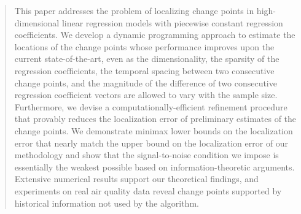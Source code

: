 \documentclass[twoside]{article}
\begin{document}
%

%


\begin{abstract}
This paper addresses the problem of localizing change points in high-dimensional linear regression models with piecewise constant regression coefficients. We develop a dynamic programming approach to estimate the locations of the change points whose performance improves upon the current state-of-the-art, even as the dimensionality, the sparsity of the regression coefficients, the temporal spacing between two consecutive change points, and the magnitude of the difference of two consecutive regression coefficient vectors are allowed to vary with the sample size. Furthermore, we devise a computationally-efficient refinement procedure that provably reduces the localization error of preliminary estimates of the change points. We demonstrate minimax lower bounds on the localization error that nearly match the upper bound on the localization error of our methodology and show that the signal-to-noise condition we impose is essentially the weakest possible based on information-theoretic arguments. Extensive numerical results support our theoretical findings, and experiments on real air quality data reveal change points supported by historical information not used by the algorithm.
\end{abstract}
\end{document}
